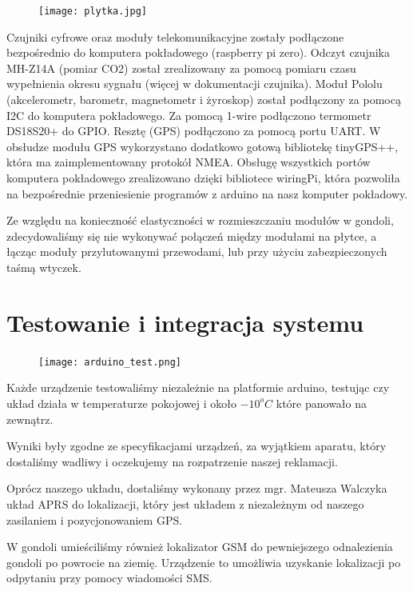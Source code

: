 \documentclass[a4paper,12pt]{article}
\begin{document}
\begin{figure}[H]
\texttt{[image: plytka.jpg]}
\centering{}
 \label{plytka}
\end{figure}

Czujniki cyfrowe oraz moduły telekomunikacyjne zostały podłączone bezpośrednio do komputera pokładowego (raspberry pi zero). Odczyt czujnika  MH-Z14A (pomiar CO2) został zrealizowany za pomocą pomiaru czasu wypełnienia okresu sygnału (więcej w dokumentacji czujnika). Moduł Pololu (akcelerometr, barometr, magnetometr i żyroskop) został podłączony za pomocą I2C do komputera pokładowego. Za pomocą 1-wire podłączono termometr DS18S20+ do GPIO. Resztę (GPS) podłączono za pomocą portu UART. W obsłudze modułu GPS wykorzystano dodatkowo gotową bibliotekę tinyGPS++, która ma zaimplementowany protokół NMEA. Obsługę wszystkich portów komputera pokładowego zrealizowano dzięki bibliotece wiringPi, która pozwoliła na bezpośrednie przeniesienie programów z arduino na nasz komputer pokładowy.




Ze względu na konieczność elastyczności w rozmieszczaniu modułów w gondoli, zdecydowaliśmy się nie wykonywać połączeń między modułami na płytce, a łącząc moduły przylutowanymi przewodami, lub przy użyciu zabezpieczonych taśmą wtyczek.


\section{Testowanie i integracja systemu}

\begin{figure}[H]
\texttt{[image: arduino\_test.png]}
\centering{}
\end{figure}

Każde urządzenie testowaliśmy niezależnie na platformie arduino, testując czy układ działa w temperaturze pokojowej i około $-10^oC$ które panowało na zewnątrz.

Wyniki były zgodne ze specyfikacjami urządzeń, za wyjątkiem aparatu, który dostaliśmy wadliwy i oczekujemy na rozpatrzenie naszej reklamacji.

Oprócz naszego układu, dostaliśmy wykonany przez mgr. Mateusza Walczyka układ APRS do lokalizacji, który jest układem z niezależnym od naszego zasilaniem i pozycjonowaniem GPS.

W gondoli umieściliśmy również lokalizator GSM do pewniejszego odnalezienia gondoli po powrocie na ziemię. Urządzenie to umożliwia uzyskanie lokalizacji po odpytaniu przy pomocy wiadomości SMS.
\end{document}
